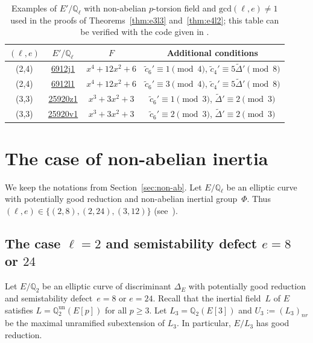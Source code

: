 \documentclass[12pt]{amsart}
\numberwithin{equation}{section}
\theoremstyle{definition}
\renewcommand{\gcd}{\text{gcd}}
\newcommand{\Q}{\mathbb{Q}}
\newcommand{\LMFDBE}[1]{\href{https://www.lmfdb.org/EllipticCurve/Q/#1}{\textsf{#1}}}
\begin{document}
\begin{table}[ht]
    \centering
    \begin{tabular}{|c||c|c|c|}
        \hline
        $(\ell, e)$ & $E'/\Q_\ell$ & $F$ & Additional conditions \\ \hline
        (2,4)& \LMFDBE{6912j1}  & $x^4 + 12x^2 + 6$ &$\tilde{c}_6'\equiv 1 \pmod 4$, $\tilde{c}_4' \equiv 5\tilde{\Delta}' \pmod 8$ \\ \hline
         (2,4)& \LMFDBE{6912l1}  & $x^4 + 12x^2 + 6$  & $\tilde{c}_6'\equiv 3 \pmod 4$, $\tilde{c}_4' \equiv 5\tilde{\Delta}' \pmod 8$ \\ \hline
        (3,3)&  \LMFDBE{25920z1} & $x^3+3x^2+3$ & $\tilde{c}_6'\equiv 1 \pmod 3$, $\tilde{\Delta}'\equiv 2 \pmod 3$ \\ \hline
        (3,3)&  \LMFDBE{25920v1} &$x^3+3x^2+3$  & $\tilde{c}_6'\equiv 2 \pmod 3$, $\tilde{\Delta}'\equiv 2 \pmod 3$ \\ \hline
    \end{tabular}
    \vspace{2mm}
   \caption{Examples
   of $E'/\Q_\ell$ with non-abelian $p$-torsion field and $\gcd(\ell,e)\neq 1$ used in the proofs of Theorems~\ref{thm:e3l3} and~\ref{thm:e4l2}; this table can be verified with the code given in \cite[Table 3]{git}.}
    \label{tab:abelian_examples}
\end{table}
\vspace{-8mm}
\section{The case of non-abelian inertia}

We keep the notations from Section~\ref{sec:non-ab}.
Let $E/\Q_\ell$ be an elliptic curve with potentially good reduction and non-abelian inertial group~$\Phi$. Thus $(\ell,e)\in \{(2,8),(2,24),(3,12)\}$ (see~\cite{Kraus}).

\subsection{The case \texorpdfstring{$\ell=2$ and semistability defect $e=8$ or $24$}{}} \label{s:e8e24}

Let $E/\Q_2$ be an elliptic curve of discriminant $\Delta_E$ with potentially good reduction and semistability defect~$e=8$ or $e=24$.
Recall that the inertial field~$L$ of $E$ satisfies
$L = \Q_2^{\text{un}}(E[p])$ for all $p \geq 3$.
Let $L_3=\Q_2(E[3])$ and $U_3 := (L_3)_{nr}$ be the maximal unramified subextension of $L_3$.
In particular, $E/L_3$ has good reduction.
\end{document}
